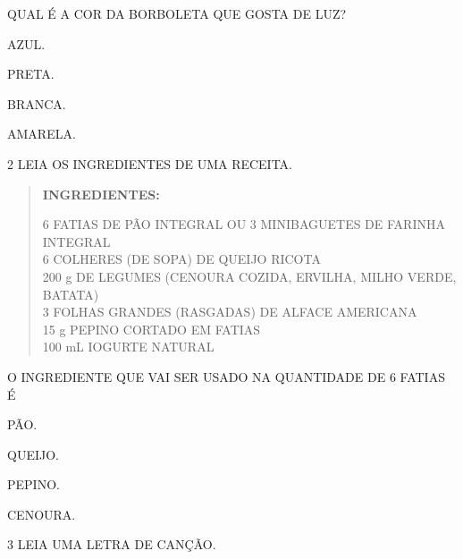 
QUAL É A COR DA BORBOLETA QUE GOSTA DE LUZ?

\begin{escolha}
\item
  AZUL.
\item
  PRETA.
\item
  BRANCA.
\item
  AMARELA.
\end{escolha}

\num{2} LEIA OS INGREDIENTES DE UMA RECEITA.

\begin{quote}
\textbf{INGREDIENTES:}\\

\begin{flushleft}
6 FATIAS DE PÃO INTEGRAL OU 3 MINIBAGUETES DE FARINHA INTEGRAL\\
6 COLHERES (DE SOPA) DE QUEIJO RICOTA\\
200 g DE LEGUMES (CENOURA COZIDA, ERVILHA, MILHO VERDE, BATATA)\\
3 FOLHAS GRANDES (RASGADAS) DE ALFACE AMERICANA\\
15 g PEPINO CORTADO EM FATIAS\\
100 mL IOGURTE NATURAL
\end{flushleft}

\end{quote}

O INGREDIENTE QUE VAI SER USADO NA QUANTIDADE DE 6 FATIAS É

\begin{escolha}
\item PÃO.

\item QUEIJO.

\item PEPINO.

\item CENOURA.
\end{escolha}

\pagebreak
\num{3} LEIA UMA LETRA DE CANÇÃO.

